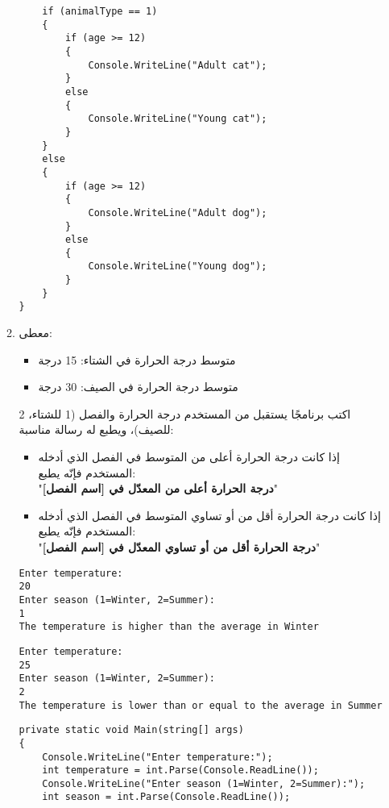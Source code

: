 \documentclass[12pt, twoside]{article}
\begin{document}
\begin{enumerate}[itemsep=3em]
\begin{enumerate}
\begin{boxSolution}
\begin{english}
\begin{verbatim}
    if (animalType == 1)
    {
        if (age >= 12)
        {
            Console.WriteLine("Adult cat");
        }
        else
        {
            Console.WriteLine("Young cat");
        }
    }
    else
    {
        if (age >= 12)
        {
            Console.WriteLine("Adult dog");
        }
        else
        {
            Console.WriteLine("Young dog");
        }
    }
}
\end{verbatim}
\end{english}
\end{boxSolution}
\clearpage
\fi
\fi

\item
معطى:
\begin{itemize}
\item متوسط درجة الحرارة في الشتاء: 15 درجة
\item متوسط درجة الحرارة في الصيف: 30 درجة
\end{itemize}
اكتب برنامجًا يستقبل من المستخدم درجة الحرارة والفصل (1 للشتاء، 2 للصيف)، ويطبع له رسالة مناسبة:
\begin{itemize}
\item إذا كانت درجة الحرارة أعلى من المتوسط في الفصل الذي أدخله المستخدم فإنّه يطبع: \\ "\textbf{درجة الحرارة أعلى من المعدّل في [اسم الفصل]}"
\item إذا كانت درجة الحرارة أقل من أو تساوي المتوسط في الفصل الذي أدخله المستخدم فإنّه يطبع: \\ "\textbf{درجة الحرارة أقل من أو تساوي المعدّل في [اسم الفصل]}"
\end{itemize}
\ifdetailed
\begin{boxExample}[1]
\begin{english}
\begin{verbatim}
Enter temperature:
20
Enter season (1=Winter, 2=Summer):
1
The temperature is higher than the average in Winter
\end{verbatim}
\end{english}
\end{boxExample}
\begin{boxExample}[2]
\begin{english}
\begin{verbatim}
Enter temperature:
25
Enter season (1=Winter, 2=Summer):
2
The temperature is lower than or equal to the average in Summer
\end{verbatim}
\end{english}
\end{boxExample}

\ifwithsols
\begin{boxSolution}
\begin{english}
\begin{verbatim}
private static void Main(string[] args)
{
    Console.WriteLine("Enter temperature:");
    int temperature = int.Parse(Console.ReadLine());
    Console.WriteLine("Enter season (1=Winter, 2=Summer):");
    int season = int.Parse(Console.ReadLine());


\end{verbatim}
\end{english}
\end{boxSolution}
\end{enumerate}
\end{enumerate}
\end{document}
